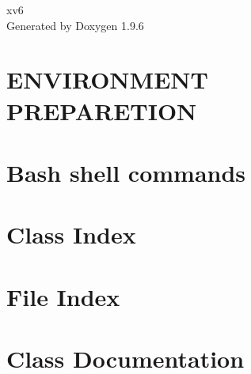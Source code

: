 \documentclass[twoside]{book}
\newcommand{\+}{\discretionary{\mbox{\scriptsize$\hookleftarrow$}}{}{}}
\newcommand{\clearemptydoublepage}{%
    \newpage{\pagestyle{empty}\cleardoublepage}%
  }
\begin{document}
  \raggedbottom
    \hypersetup{pageanchor=false,
                bookmarksnumbered=true,
                pdfencoding=unicode
               }
  \begin{titlepage}
  \vspace*{7cm}
  \begin{center}%
  {\Large xv6}\\
  \vspace*{1cm}
  {\large Generated by Doxygen 1.9.6}\\
  \end{center}
  \end{titlepage}
  \clearemptydoublepage
  \tableofcontents
  \clearemptydoublepage
  \hypersetup{pageanchor=true}
\chapter{ENVIRONMENT PREPARETION}
\label{md_README}

\chapter{Bash shell commands}
\label{md_xv6_gdb}

\chapter{Class Index}

\chapter{File Index}

\chapter{Class Documentation}





































\end{document}
